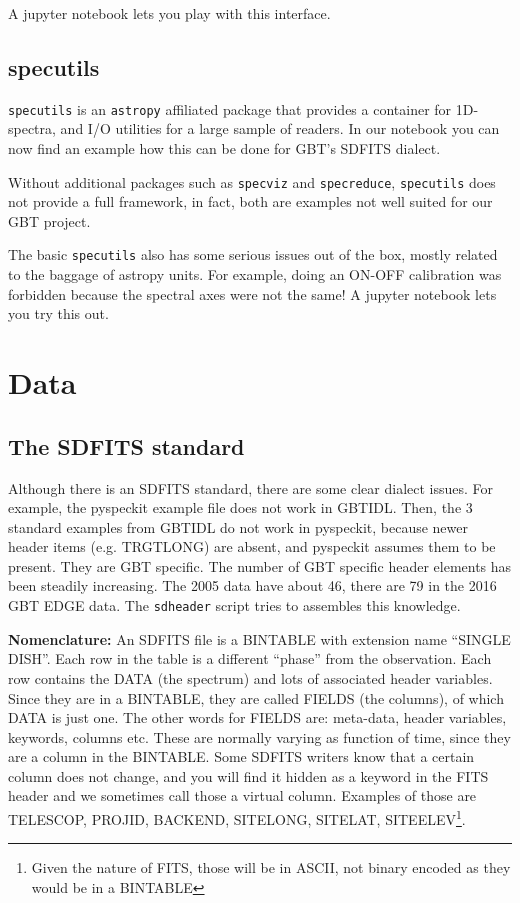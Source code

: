 \documentclass[12pt,a4paper]{article}
\begin{document}
A jupyter notebook lets you play with this interface.

\subsection{specutils}

{\tt specutils} is an {\tt astropy} affiliated package that provides
a container for 1D-spectra, and I/O utilities for a large sample
of readers. In our notebook you can now find an example how this
can be done for GBT's SDFITS dialect.

Without additional packages such as {\tt specviz} and {\tt specreduce},
{\tt specutils} does not provide a full framework, in fact, both are
examples not well suited for our GBT project.

The basic {\tt specutils} also has some serious issues out of the box,
mostly related to the baggage of astropy units. For example,
doing an ON-OFF calibration was forbidden because the spectral axes
were not the same! A jupyter notebook lets you try this out.



\section{Data}

\subsection{The SDFITS standard}

Although there is an SDFITS standard, there are some clear dialect
issues. For example, the pyspeckit example file does not work in
GBTIDL. Then, the 3 standard examples from GBTIDL do not work in
pyspeckit, because newer header items (e.g. TRGTLONG) are absent, and
pyspeckit assumes them to be present. They are GBT specific.  The
number of GBT specific header elements has been steadily
increasing. The 2005 data have about 46, there are 79 in the 2016 GBT
EDGE data. The {\tt sdheader} script tries to assembles this knowledge.


\bigskip\noindent

{\bf Nomenclature:} An SDFITS file is a BINTABLE with extension name
``SINGLE DISH''. Each row in the table is a different ``phase'' from
the observation. Each row contains the DATA (the spectrum) and lots of
associated header variables. Since they are in a BINTABLE, they are
called FIELDS (the columns), of which DATA is just one. The other words for
FIELDS are: meta-data, header variables, keywords, columns etc.
These are normally varying as function of time, since they are a column in
the BINTABLE. Some SDFITS writers know that a certain column does not change,
and you will find it hidden as a keyword in the FITS header and we sometimes
call those a virtual column. Examples of those are TELESCOP, PROJID, BACKEND,
SITELONG, SITELAT, SITEELEV\footnote{Given the nature of FITS, those will be in ASCII,
not binary encoded as they would be in a BINTABLE}.
\end{document}

